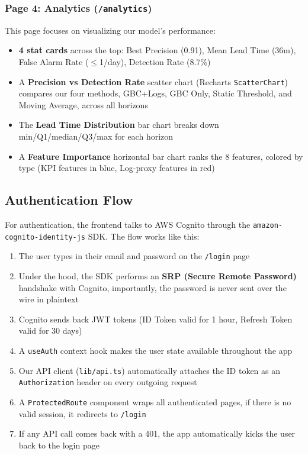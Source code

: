 \documentclass[11pt,a4paper]{article}
\begin{document}
\subsubsection{Page 4: Analytics (\texttt{/analytics})}

This page focuses on visualizing our model's performance:
\begin{itemize}[leftmargin=2em]
    \item \textbf{4 stat cards} across the top: Best Precision (0.91), Mean Lead Time (36m), False Alarm Rate ($\leq$1/day), Detection Rate (8.7\%)
    \item A \textbf{Precision vs Detection Rate} scatter chart (Recharts \texttt{ScatterChart}) compares our four methods, GBC+Logs, GBC Only, Static Threshold, and Moving Average, across all horizons
    \item The \textbf{Lead Time Distribution} bar chart breaks down min/Q1/median/Q3/max for each horizon
    \item A \textbf{Feature Importance} horizontal bar chart ranks the 8 features, colored by type (KPI features in blue, Log-proxy features in red)
\end{itemize}

\subsection{Authentication Flow}

For authentication, the frontend talks to AWS Cognito through the \texttt{amazon-cognito-identity-js} SDK. The flow works like this:

\begin{enumerate}[leftmargin=2em]
    \item The user types in their email and password on the \texttt{/login} page
    \item Under the hood, the SDK performs an \textbf{SRP (Secure Remote Password)} handshake with Cognito, importantly, the password is never sent over the wire in plaintext
    \item Cognito sends back JWT tokens (ID Token valid for 1 hour, Refresh Token valid for 30 days)
    \item A \texttt{useAuth} context hook makes the user state available throughout the app
    \item Our API client (\texttt{lib/api.ts}) automatically attaches the ID token as an \texttt{Authorization} header on every outgoing request
    \item A \texttt{ProtectedRoute} component wraps all authenticated pages, if there is no valid session, it redirects to \texttt{/login}
    \item If any API call comes back with a 401, the app automatically kicks the user back to the login page
\end{enumerate}
\end{document}
